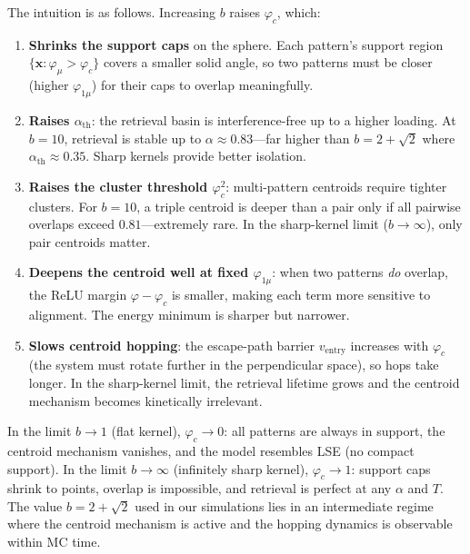 \documentclass[11pt]{article}
\newcommand{\bx}{\mathbf{x}}
\begin{document}
The intuition is as follows.  Increasing $b$ raises $\varphi_c$, which:

\begin{enumerate}
\item \textbf{Shrinks the support caps} on the sphere.  Each pattern's support region $\{\bx : \varphi_\mu > \varphi_c\}$ covers a smaller solid angle, so two patterns must be closer (higher $\varphi_{1\mu}$) for their caps to overlap meaningfully.

\item \textbf{Raises $\alpha_{\mathrm{th}}$}: the retrieval basin is interference-free up to a higher loading.  At $b = 10$, retrieval is stable up to $\alpha \approx 0.83$---far higher than $b = 2\!+\!\sqrt{2}$ where $\alpha_{\mathrm{th}} \approx 0.35$.  Sharp kernels provide better isolation.

\item \textbf{Raises the cluster threshold $\varphi_c^2$}: multi-pattern centroids require tighter clusters.  For $b = 10$, a triple centroid is deeper than a pair only if all pairwise overlaps exceed $0.81$---extremely rare.  In the sharp-kernel limit ($b \to \infty$), only pair centroids matter.

\item \textbf{Deepens the centroid well at fixed $\varphi_{1\mu}$}: when two patterns \emph{do} overlap, the ReLU margin $\varphi - \varphi_c$ is smaller, making each term more sensitive to alignment.  The energy minimum is sharper but narrower.

\item \textbf{Slows centroid hopping}: the escape-path barrier $v_{\mathrm{entry}}$ increases with $\varphi_c$ (the system must rotate further in the perpendicular space), so hops take longer.  In the sharp-kernel limit, the retrieval lifetime grows and the centroid mechanism becomes kinetically irrelevant.
\end{enumerate}

In the limit $b \to 1$ (flat kernel), $\varphi_c \to 0$: all patterns are always in support, the centroid mechanism vanishes, and the model resembles LSE (no compact support).  In the limit $b \to \infty$ (infinitely sharp kernel), $\varphi_c \to 1$: support caps shrink to points, overlap is impossible, and retrieval is perfect at any $\alpha$ and $T$.  The value $b = 2\!+\!\sqrt{2}$ used in our simulations lies in an intermediate regime where the centroid mechanism is active and the hopping dynamics is observable within MC time.
\end{document}
